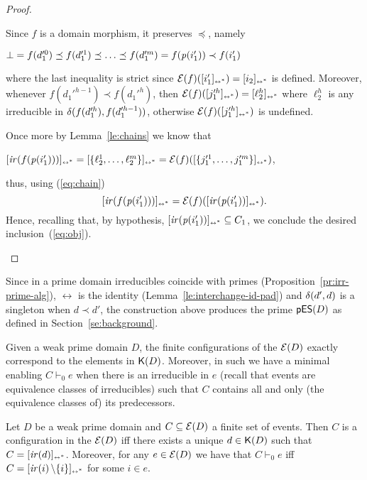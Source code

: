 \begin{proof}
\begin{itemize}
     Since $f$ is a domain morphism, it preserves $\preceq$, namely
     \begin{center}
       $\bot = f(d_1'^0) \preceq f(d_1'^1) \preceq \ldots \preceq f(d_1'^m) =
       f(\mathit{p}({i_1'})) \prec f(i_1')$
     \end{center}
     where the last inequality is strict since
     $\mathcal{E}({f})([{i_1'}]_{\scriptscriptstyle {\leftrightarrow^*}}) = [{i_2}]_{\scriptscriptstyle {\leftrightarrow^*}}$ is
     defined. Moreover, whenever $f(d_1'^{h-1}) \prec f(d_1'^h)$, then
     $\mathcal{E}({f})([{j_1'^h}]_{\scriptscriptstyle {\leftrightarrow^*}}) = [{\ell_2^h}]_{\scriptscriptstyle {\leftrightarrow^*}}$ where $\ell_2^h$
     is any irreducible in $\delta({f(d_1'^h)},{f(d_1'^{h-1})})$, otherwise
     $\mathcal{E}({f})([{j_1'^h}]_{\scriptscriptstyle {\leftrightarrow^*}})$ is undefined.

     Once more by Lemma~\ref{le:chains} we know that
     \begin{center}
       $[{\mathop{\mathit{ir}({f(\mathit{p}({i_1'}))})}}]_{\scriptscriptstyle {\leftrightarrow^*}} = [{\{\ell_2^1, \ldots,
         \ell_2^m\}}]_{\scriptscriptstyle {\leftrightarrow^*}} = \mathcal{E}({f})([{\{j_1'^1, \ldots, j_1'^m\}}]_{\scriptscriptstyle {\leftrightarrow^*}})$,
     \end{center}
     thus, using (\ref{eq:chain})
     \begin{equation}
       \label{eq:chain1}
       [{\mathop{\mathit{ir}({f(\mathit{p}({i_1'}))})}}]_{\scriptscriptstyle {\leftrightarrow^*}} =
       \mathcal{E}({f})([{\mathop{\mathit{ir}({\mathit{p}({i_1'})})}}]_{\scriptscriptstyle {\leftrightarrow^*}}).
     \end{equation}
     Hence, recalling that, by hypothesis,
     $[{\mathop{\mathit{ir}({\mathit{p}({i_1'})})}}]_{\scriptscriptstyle {\leftrightarrow^*}} \subseteq C_1$, we conclude the desired
     inclusion~(\ref{eq:obj}).
  \end{itemize}
\end{proof}





Since in a prime domain irreducibles coincide with
primes (Proposition~\ref{pr:irr-prime-alg}), $\leftrightarrow$ is the
identity (Lemma~\ref{le:interchange-id-pad}) and $\delta({d'},{d})$ is a
singleton when $d \prec d'$, the construction above produces the prime
{\esabbr} $\mathsf{pES}(D)$ as defined in Section~\ref{se:background}.


Given a weak prime domain $D$, the finite configurations of the {\esabbr}
$\mathcal{E}({D})$ exactly correspond to the elements in
$\mathop{\mathsf{K}({D})}$. Moreover, in such {\esabbr} we have a minimal enabling
$C \vdash_0 e$ when there is an irreducible in $e$ (recall that events
are equivalence classes of irreducibles) such that $C$ contains all and only
(the equivalence classes of) its predecessors.


\begin{lemma}
  \label{le:comp-conf}
  Let $D$ be a weak prime domain and $C \subseteq \mathcal{E}({D})$ a finite set
  of events.  Then $C$ is a configuration in the {\esabbr} $\mathcal{E}({D})$
  iff there exists a unique $d \in \mathop{\mathsf{K}({D})}$ such that $C =
  [{\mathop{\mathit{ir}({d})}}]_{\scriptscriptstyle {\leftrightarrow^*}}$. Moreover, for any $e \in \mathcal{E}({D})$ we have that
  $C \vdash_0 e$ iff $C = [{\mathop{\mathit{ir}({i})} \setminus \{ i \}}]_{\scriptscriptstyle {\leftrightarrow^*}}$ for
  some $i \in e$.
\end{lemma}

